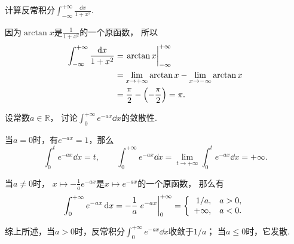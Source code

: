 \begin{example}
计算反常积分\(\int_{-\infty}^{+\infty} \frac{\dd{x}}{1+x^2}\).
\begin{solution}
因为\(\arctan x\)是\(\frac{1}{1+x^2}\)的一个原函数，
所以\begin{align*}
	\int_{-\infty}^{+\infty} \frac{\dd{x}}{1+x^2}
	&= \eval{\arctan x}_{-\infty}^{+\infty} \\
	&= \lim_{x\to+\infty} \arctan x
		-\lim_{x\to-\infty} \arctan x \\
	&= \frac{\pi}{2} - \left(-\frac{\pi}{2}\right)
	= \pi.
\end{align*}
\end{solution}
\end{example}

\begin{example}\label{example:反常积分.重要反常积分公式1}
设常数\(a\in\mathbb{R}\)，
讨论\(\int_0^{+\infty} e^{-ax} \dd{x}\)的敛散性.
\begin{solution}
当\(a=0\)时，有\(e^{-ax} = 1\)，那么\[
	\int_0^t e^{-ax} \dd{x} = t,
	\qquad
	\int_0^{+\infty} e^{-ax} \dd{x}
	= \lim_{t\to+\infty} \int_0^t e^{-ax} \dd{x}
	= +\infty.
\]

当\(a\neq0\)时，
\(x \mapsto -\frac1a e^{-ax}\)是\(x \mapsto e^{-ax}\)的一个原函数，
那么有\[
	\int_0^{+\infty} e^{-ax} \dd{x}
	= -\frac1a \eval{e^{-ax}}_0^{+\infty}
	= \left\{ \begin{array}{rl}
		1/a, & a>0, \\
		+\infty, & a < 0.
	\end{array} \right.
\]

综上所述，当\(a>0\)时，反常积分\(\int_0^{+\infty} e^{-ax} \dd{x}\)收敛于\(1/a\)；
当\(a\leq0\)时，它发散.
\end{solution}
\end{example}

